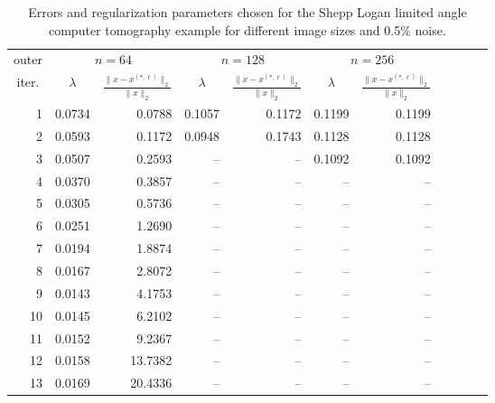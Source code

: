 \begin{table}[htp]
\caption{Errors and regularization parameters chosen for the Shepp Logan limited angle computer tomography example for different image sizes and 0.5\% noise.}
\begin{center}
\begin{tabular}{|r|r|r|r|r|r|r|r|r|r|r|}
\hline
\multicolumn{1}{|c|}{outer} & \multicolumn{2}{c|}{$n = 64$} & \multicolumn{2}{c|}{$n = 128$} & \multicolumn{2}{c|}{$n = 256$} \\\cline{2-7}
\multicolumn{1}{|c|}{iter.} & \multicolumn{1}{c|}{$\lambda$} & \multicolumn{1}{c|}{$\frac{\|x - x^{(*,\ell)}\|_2}{\|x\|_2}$} & \multicolumn{1}{c|}{$\lambda$} & \multicolumn{1}{c|}{$\frac{\|x - x^{(*,\ell)}\|_2}{\|x\|_2}$}  & \multicolumn{1}{c|}{$\lambda$} & \multicolumn{1}{c|}{$\frac{\|x - x^{(*,\ell)}\|_2}{\|x\|_2}$} \\
\hline
1 & 0.0734 & 0.0788 & 0.1057 & 0.1172 & 0.1199 & 0.1199 \\
2 & 0.0593 & 0.1172 & 0.0948 & 0.1743 & 0.1128 & 0.1128 \\
3 & 0.0507 & 0.2593 & -- & -- & 0.1092 & 0.1092 \\
4 & 0.0370 & 0.3857 & -- & -- & -- & -- \\
5 & 0.0305 & 0.5736 & -- & -- & -- & -- \\
6 & 0.0251 & 1.2690 & -- & -- & -- & -- \\
7 & 0.0194 & 1.8874 & -- & -- & -- & -- \\
8 & 0.0167 & 2.8072 & -- & -- & -- & -- \\
9 & 0.0143 & 4.1753 & -- & -- & -- & -- \\
10 & 0.0145 & 6.2102 & -- & -- & -- & -- \\
11 & 0.0152 & 9.2367 & -- & -- & -- & -- \\
12 & 0.0158 & 13.7382 & -- & -- & -- & -- \\
13 & 0.0169 & 20.4336 & -- & -- & -- & -- \\\hline
\end{tabular}
\end{center}
\label{tab:limited_angle_grains_errs_and_reg_params}
\end{table}%

